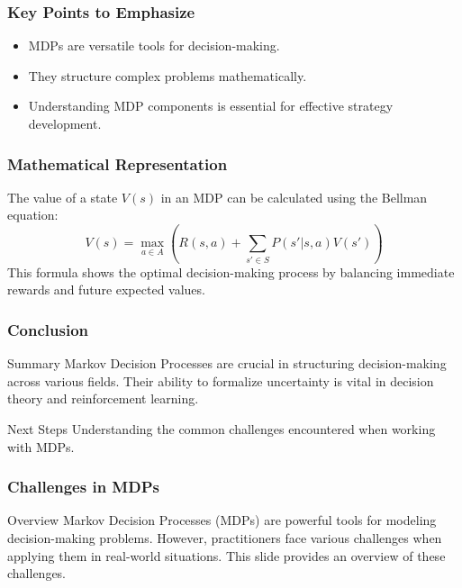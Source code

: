 \documentclass[aspectratio=169]{beamer}
\begin{document}
\begin{frame}[fragile]
  \frametitle{Key Points to Emphasize}
  \begin{itemize}
    \item MDPs are versatile tools for decision-making.
    \item They structure complex problems mathematically.
    \item Understanding MDP components is essential for effective strategy development.
  \end{itemize}
\end{frame}

\begin{frame}[fragile]
  \frametitle{Mathematical Representation}
  The value of a state \( V(s) \) in an MDP can be calculated using the Bellman equation:
  \begin{equation}
    V(s) = \max_{a \in A} \left( R(s, a) + \sum_{s' \in S} P(s' | s, a) V(s') \right)
  \end{equation}
  This formula shows the optimal decision-making process by balancing immediate rewards and future expected values.
\end{frame}

\begin{frame}[fragile]
  \frametitle{Conclusion}
  \begin{block}{Summary}
    Markov Decision Processes are crucial in structuring decision-making across various fields. Their ability to formalize uncertainty is vital in decision theory and reinforcement learning.
  \end{block}
  \begin{block}{Next Steps}
    Understanding the common challenges encountered when working with MDPs.
  \end{block}
\end{frame}

\begin{frame}[fragile]
    \frametitle{Challenges in MDPs}
    \begin{block}{Overview}
        Markov Decision Processes (MDPs) are powerful tools for modeling decision-making problems. However, practitioners face various challenges when applying them in real-world situations. This slide provides an overview of these challenges.
    \end{block}
\end{frame}
\end{document}
